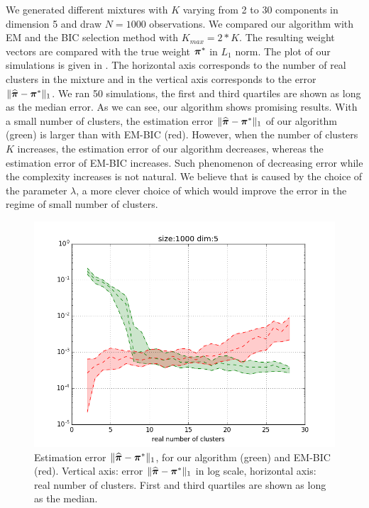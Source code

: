 We generated different mixtures with $K$ varying from 2 to 30 components in dimension 5 and draw $N=1000$ observations. We compared our algorithm with EM and the BIC selection method with $K_{max}=2*K$. The resulting weight vectors are compared with the true weight $\boldsymbol \pi^*$ in $L_1$ norm. The plot of our simulations is given in . The horizontal axis corresponds to the number of real clusters in the mixture and in the vertical axis corresponds to the error  $\|\widehat{\boldsymbol \pi}-\boldsymbol \pi^*\|_1$. We ran 50 simulations, the first and third quartiles are shown as long as the median error. As we can see, our algorithm shows promising results. With a small number of clusters, the estimation error $\|\widehat{\boldsymbol \pi}-\boldsymbol \pi^*\|_1$ of our algorithm (green) is larger than with EM-BIC (red). However, when the number of clusters $K$ increases, the estimation error of our algorithm decreases, whereas the estimation error of EM-BIC increases. Such phenomenon of decreasing error while the complexity increases is not natural. We believe that is caused by the choice of the parameter $\lambda$, a more clever choice of which would improve the error in the regime of small number of clusters.
\begin{figure}
\center
  \includegraphics[scale=0.45]{./TeX_files/SparseWeightsVectorEstimation.png}
  \caption{Estimation error $\|\widehat{\boldsymbol \pi}-\boldsymbol \pi^*\|_1$, for our algorithm (green) and EM-BIC (red). Vertical axis: error $\|\widehat{\boldsymbol \pi}-\boldsymbol \pi^*\|_1$ in log scale, horizontal axis: real number of clusters. First and third quartiles are shown as long as the median.}
  \label{fig:results_alpha_pen}
\end{figure}

